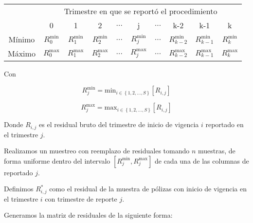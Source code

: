 \documentclass[11pt,twoside,openright,spanish]{report}
\numberwithin{equation}{chapter}
\numberwithin{figure}{chapter}
\numberwithin{table}{chapter}
\begin{document}
	\begin{table}[ht]
		\centering
		
		\begin{tabularx}{\linewidth}{ c|ccccccccc}
			& \multicolumn{9}{c}{Trimestre en que se reportó el procedimiento} \\
			& 0  & 1 & 2 & $ \dots $ & j & $\dots $ & k-2 & k-1 &  k\\
			\midrule
			Mínimo      &  $R_{0}^{\text{min}}$ & $R_{1}^{\text{min}}$ & $R_{2}^{\text{min}}$ & $ \dots $ & $R_{j}^{\text{min}}$ & $ \dots $ & $R_{k-2}^{\text{min}}$ & $R_{k-1}^{\text{min}}$ & $R_{k}^{\text{min}}$ \\
			Máximo      &  $R_{0}^{\text{max}}$ & $R_{1}^{\text{max}}$ & $R_{2}^{\text{max}}$ & $ \dots $ & $R_{j}^{\text{max}}$ & $ \dots $ & $R_{k-2}^{\text{max}}$ & $R_{k-1}^{\text{max}}$ & $R_{k}^{\text{max}}$ \\
		\end{tabularx}
	\end{table}
	
	Con

	$$R_{j}^{\text{min}}= \text{min}_{ i\in \left\{1,2,\dots ,S\right\}} \left[R_{i,j}^{}\right]$$	
	
	$$R_{j}^{\text{max}}= \text{max}_{ i\in \left\{1,2,\dots ,S\right\}} \left[R_{i,j}^{}\right]$$	 

	Donde $R_{i,j}$ es el residual bruto del trimestre de inicio de vigencia $i$ reportado en el trimestre $j$.

	Realizamos un muestreo con reemplazo de residuales tomando $n$ muestras, de forma uniforme dentro del intervalo $\left[R_{j}^{\text{min}},R_{j}^{\text{max}}\right]$ de cada una de las columnas de reportado $j$.
	
	Definimos $R_{i,j}^{*}$ como el residual de la muestra de pólizas con inicio de vigencia en el trimestre $i$ con trimestre de reporte $j$. 
	
	Generamos la matriz de residuales de la siguiente forma:
	
\end{document}
